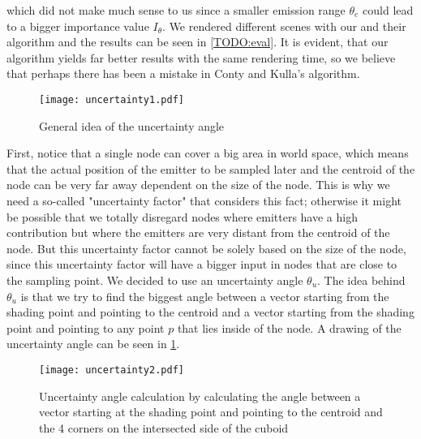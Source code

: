 which did not make much sense to us since a smaller emission range $\theta_e$ could lead to a bigger importance value $I_\theta$. We rendered different scenes with our and their algorithm and the results can be seen in \ref{TODO:eval}. It is evident, that our algorithm yields far better results with the same rendering time, so we believe that perhaps there has been a mistake in Conty and Kulla's algorithm.

\begin{figure}
	\begin{center}
		\texttt{[image: uncertainty1.pdf]}
		\caption{General idea of the uncertainty angle}
		\label{fig:uncertainty1}
	\end{center}
\end{figure}

First, notice that a single node can cover a big area in world space, which means that the actual position of the emitter to be sampled later and the centroid of the node can be very far away dependent on the size of the node. This is why we need a so-called "uncertainty factor" that considers this fact; otherwise it might be possible that we totally disregard nodes where emitters have a high contribution but where the emitters are very distant from the centroid of the node. But this uncertainty factor cannot be solely based on the size of the node, since this uncertainty factor will have a bigger input in nodes that are close to the sampling point. We decided to use an uncertainty angle $\theta_u$. The idea behind $\theta_u$ is that we try to find the biggest angle between a vector starting from the shading point and pointing to the centroid and a vector starting from the shading point and pointing to any point $p$ that lies inside of the node. A drawing of the uncertainty angle can be seen in \ref{fig:uncertainty1}.

\begin{figure}
	\begin{center}
		\texttt{[image: uncertainty2.pdf]}
		\caption{Uncertainty angle calculation by calculating the angle between a vector starting at the shading point and pointing to the centroid and the 4 corners on the intersected side of the cuboid}
		\label{fig:uncertainty2}
	\end{center}
\end{figure}

